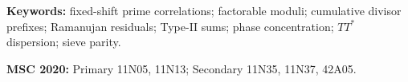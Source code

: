 \documentclass[11pt]{article}
\theoremstyle{definition}
\theoremstyle{remark}
\begin{document}
\noindent\textbf{Keywords:} fixed-shift prime correlations; factorable
moduli; cumulative divisor prefixes; Ramanujan residuals; Type-II sums;
phase concentration; $TT^*$ dispersion; sieve parity.

\medskip
\noindent\textbf{MSC 2020:} Primary 11N05, 11N13; Secondary
11N35, 11N37, 42A05.














\end{document}
